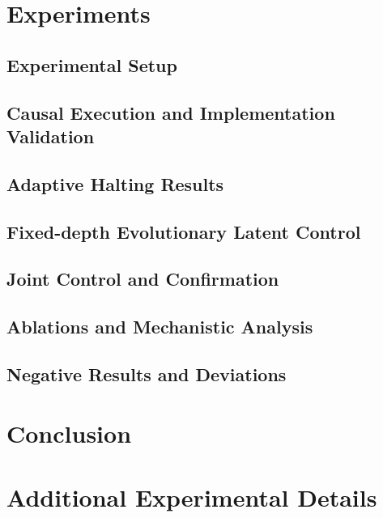 \documentclass[11pt]{article}
\begin{document}
\section{Experiments}
\subsection{Experimental Setup}
\subsection{Causal Execution and Implementation Validation}
\subsection{Adaptive Halting Results}
\subsection{Fixed-depth Evolutionary Latent Control}
\subsection{Joint Control and Confirmation}
\subsection{Ablations and Mechanistic Analysis}
\subsection{Negative Results and Deviations}

\section{Conclusion}





\appendix
\section{Additional Experimental Details}
\end{document}
